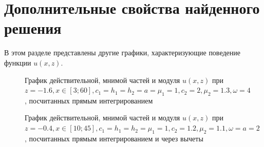 \documentclass[a4paper, 12pt]{article}
\begin{document}
\section{Дополнительные свойства найденного решения}
В этом разделе представлены другие графики, характеризующие поведение функции $u(x,z)$.

\begin{figure}[h!]
\noindent{}
\caption{График действительной, мнимой частей и модуля $u(x,z)$ при $z=-1.6, x \in [3;60], c_1=h_1=h_2=a=\mu_1=1, c_2=2,\mu_2=1.3,\omega=4$, посчитанных прямым интегрированием}
\label{figCurves}
\end{figure}

\begin{figure}[h!]
\noindent{}
\caption{График действительной, мнимой частей и модуля $u(x,z)$ при $z=-0.4, x \in [10;45], c_1=h_1=h_2=\mu_1=1, c_2=1.2,\mu_2=1.1,\omega=a=2$, посчитанных прямым интегрированием и через вычеты}
\label{figCurves}
\end{figure}
\end{document}
